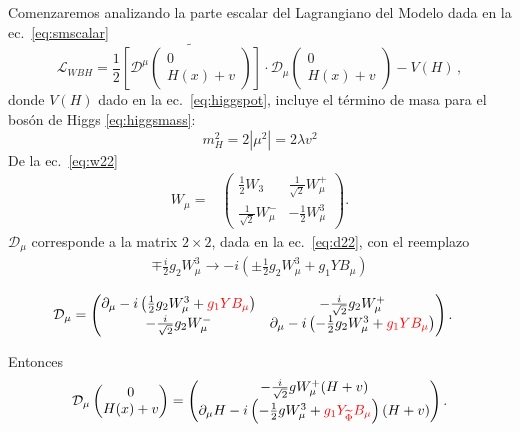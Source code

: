 \begin{frame}
Comenzaremos analizando la parte escalar del Lagrangiano del Modelo dada en la ec.~\eqref{eq:smscalar}
\begin{equation}
  \mathcal{L}_{WBH}=\frac{1}{2}\widetilde{\left[\mathcal{D}^\mu \begin{pmatrix}
    0\\
    H(x)+v
  \end{pmatrix}\right]}\cdot \mathcal{D}_\mu\begin{pmatrix}
    0\\
    H(x)+v
  \end{pmatrix}-V(H)\,,
\end{equation}
donde $V(H)$ dado en la ec.~\eqref{eq:higgspot}, incluye el término de masa para el bosón de Higgs \eqref{eq:higgsmass}:
\begin{equation}
  m_H^2=2\left|\mu^2\right|=2\lambda v^2
\end{equation}
De la ec.~\eqref{eq:w22}
\begin{align}
      W_\mu=&\begin{pmatrix}
    \frac{1}{2}W_3&\frac{1}{\sqrt{2}}W^+_\mu\\
    \frac{1}{\sqrt{2}}W^-_\mu&-\frac{1}{2}W^3_\mu
  \end{pmatrix}.
\end{align}
$\mathcal{D}_\mu$ corresponde a la matrix $2\times  2$, dada en la ec.~\eqref{eq:d22}, con el reemplazo
\begin{align}
\mp\frac{i}{2}g_2 W^3_\mu\to  -i\left(\pm\frac{1}{2}g_2 W^3_\mu+{g_1}Y B_\mu\right)
\end{align}

\begin{align}
 \mathcal{D}_\mu &=  \begin{pmatrix}
    \partial_\mu-i\left(\frac{1}{2}g_2 W^3_\mu+{\color{red}{g_1} Y B_\mu}\right)&-\frac{i}{\sqrt{2}}g_2 W^+_\mu\\
    -\frac{i}{\sqrt{2}}g_2 W^-_\mu&\partial_\mu-i\left(-\frac{1}{2}g_2 W^3_\mu+{\color{red}{g_1}Y B_\mu}\right)
  \end{pmatrix}.
\end{align}

Entonces
\begin{align}
\mathcal{D}_\mu \begin{pmatrix}
    0\\
    H(x)+v
  \end{pmatrix}=\begin{pmatrix}
    -\frac{i}{\sqrt{2}}gW_\mu^+(H+v)\\
    \partial_\mu H-i\left(-\frac{1}{2}gW^3_\mu+{\color{red}{g_1}Y_{\widetilde{\Phi}} B_\mu}\right)(H+v)
  \end{pmatrix}.
\end{align}


\end{frame}
